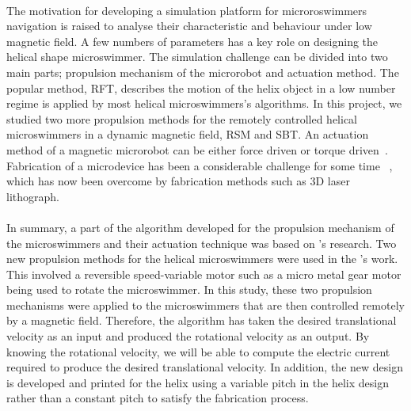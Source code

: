 \documentclass[12pt,a4paper,titlepage]{report}
\begin{document}
\paragraph{}
The motivation for developing a simulation platform for microroswimmers navigation is raised to analyse
 their characteristic and behaviour under low magnetic field. A few numbers of parameters 
has a key role on designing the helical shape microswimmer. The simulation
challenge can be divided into two main parts; propulsion mechanism of the microrobot and actuation method. The
popular method, \ac*{RFT}, describes the motion of the helix object in a low number regime 
is applied by most helical microswimmers\rq{}s algorithms\citep{qiu2014noncytotoxic}. In this
project, we studied two more propulsion methods for the remotely controlled helical microswimmers
 in a dynamic magnetic field, \ac*{RSM} and \ac*{SBT}. An actuation method of a magnetic  microrobot 
can be either force driven or
torque driven~\citep{qiunanohelices}. Fabrication of a microdevice has been a considerable challenge 
for some time ~\citep{qiunanohelices}, which has now been
overcome by fabrication methods such as 3D laser lithograph.



\paragraph{}
In summary, a part of the algorithm developed for the propulsion mechanism of the microswimmers
and their actuation technique was based on \citeauthor{mahoney2011velocity}\rq{}s research. Two new 
propulsion methods for the helical microswimmers were used in the \citeauthor{rodenborn2013propulsion}\rq{}s
work. This involved a reversible speed-variable motor such as a micro metal gear motor being used to rotate 
the microswimmer. In this study, these two propulsion mechanisms were applied to the microswimmers that 
are then controlled remotely by a magnetic field. Therefore, the algorithm has taken the desired translational
velocity as an input and produced the rotational velocity as an output. By knowing the rotational velocity, 
we will be able to compute the electric current required to produce the desired translational velocity. 
In addition, the new design is developed and printed for the helix using a variable pitch
in the helix design rather than a constant pitch to satisfy 
 the fabrication process. 



\end{document}

